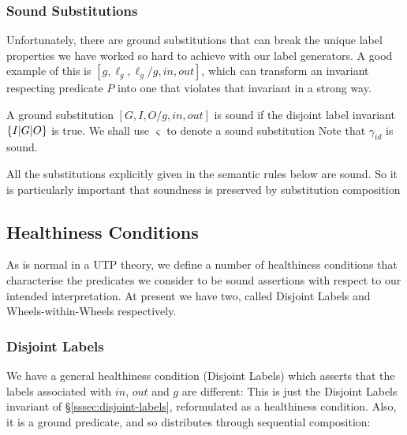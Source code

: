 \subsubsection{Sound Substitutions}

Unfortunately, there are ground substitutions
that can break the unique label properties
we have worked so hard to achieve with our label generators.
A good example of this is $[g,\ell_g,\ell_g/g,in,out]$,
which can transform an invariant respecting predicate $P$
into one that violates that invariant in a strong way.

A ground substitution $[G,I,O/g,in,out]$ is sound
if the disjoint label invariant $\{I|G|O\}$ is true.
We shall use $\varsigma$ to denote a sound substitution
Note that $\gamma_{id}$ is sound.

All the substitutions explicitly given in the semantic rules below
are sound.
So it is particularly important that soundness is preserved by
substitution composition




\subsection{Healthiness Conditions}

As is normal in a UTP theory,
we define a number of healthiness conditions
that characterise the predicates we consider to be sound assertions
with respect to our intended interpretation.
At present we have two, called Disjoint Labels
and Wheels-within-Wheels respectively.

\subsubsection{Disjoint Labels}\label{sssec:disj-labels}

We have a general healthiness condition (Disjoint Labels) which asserts that
the labels associated with $in$, $out$ and $g$ are different:
 This is just the Disjoint Labels invariant of
\S\ref{sssec:disjoint-labels}, reformulated as a healthiness condition. Also,
it is a ground predicate, and so distributes through sequential composition:

